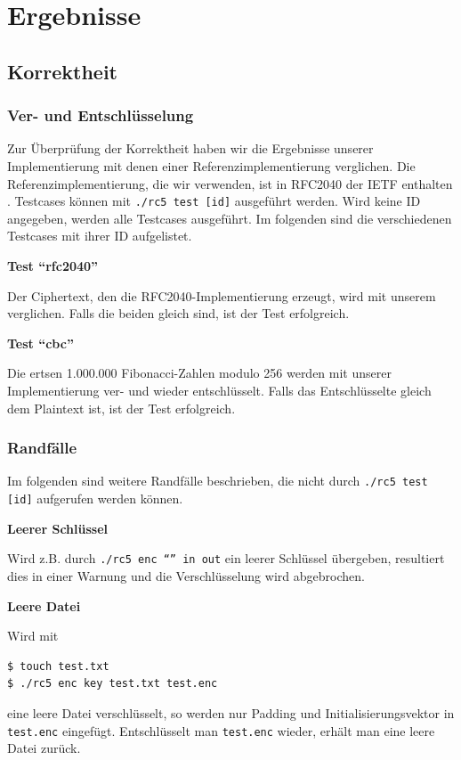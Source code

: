 \documentclass[course=erap]{aspdoc}
\begin{document}
\section{Ergebnisse}

\subsection{Korrektheit}

\subsubsection{Ver- und Entschlüsselung}

Zur Überprüfung der Korrektheit haben wir die Ergebnisse unserer Implementierung mit denen einer Referenzimplementierung verglichen. Die Referenzimplementierung, die wir verwenden, ist in RFC2040 der IETF enthalten \cite{rfc2040}. Testcases können mit \texttt{./rc5 test [id]} ausgeführt werden. Wird keine ID angegeben, werden alle Testcases ausgeführt. Im folgenden sind die verschiedenen Testcases mit ihrer ID aufgelistet. \bigbreak

\noindent \textbf{Test ``rfc2040''} \bigbreak

Der Ciphertext, den die RFC2040-Implementierung erzeugt, wird mit unserem verglichen. Falls die beiden gleich sind, ist der Test erfolgreich. \bigbreak

\noindent \textbf{Test ``cbc''} \bigbreak

Die ertsen 1.000.000 Fibonacci-Zahlen modulo 256 werden mit unserer Implementierung ver- und wieder entschlüsselt. Falls das Entschlüsselte gleich dem Plaintext ist, ist der Test erfolgreich.

\subsubsection{Randfälle}

Im folgenden sind weitere Randfälle beschrieben, die nicht durch \texttt{./rc5 test [id]} aufgerufen werden können. \bigbreak

\noindent \textbf{Leerer Schlüssel} \bigbreak

\noindent Wird z.B. durch \texttt{./rc5 enc ``'' in out} ein leerer Schlüssel übergeben, resultiert dies in einer Warnung und die Verschlüsselung wird abgebrochen.\bigbreak

\noindent \textbf{Leere Datei} \bigbreak

\noindent Wird mit 
\begin{verbatim}
$ touch test.txt
$ ./rc5 enc key test.txt test.enc
\end{verbatim} eine leere Datei verschlüsselt, so werden nur Padding und Initialisierungsvektor in \texttt{test.enc} eingefügt. Entschlüsselt man \texttt{test.enc} wieder, erhält man eine leere Datei zurück.\bigbreak
\end{document}
